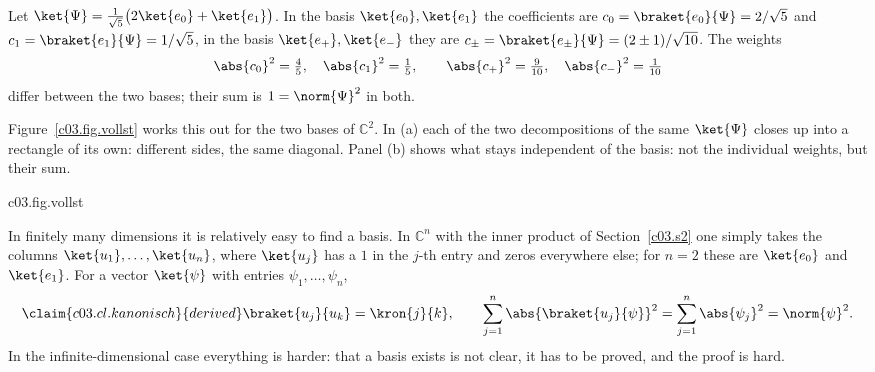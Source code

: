 \begin{example}\label{c03.ex.zwei-basen}
  Let $\ket{\Psi} = \tfrac{1}{\sqrt{5}} \bigl( 2 \ket{e_0} + \ket{e_1} \bigr)$. In the basis
  $\ket{e_0}, \ket{e_1}$ the coefficients are $c_0 = \braket{e_0}{\Psi} = 2/\sqrt{5}$ and
  $c_1 = \braket{e_1}{\Psi} = 1/\sqrt{5}$, in the basis $\ket{e_+}, \ket{e_-}$ they are
  $c_\pm = \braket{e_\pm}{\Psi} = (2 \pm 1)/\sqrt{10}$. The weights
  \begin{equation}\label{c03.eq.gewichte}
    \abs{c_0}^2 = \tfrac45 , \quad \abs{c_1}^2 = \tfrac15 ,
    \qquad
    \abs{c_+}^2 = \tfrac{9}{10} , \quad \abs{c_-}^2 = \tfrac{1}{10}
  \end{equation}
  differ between the two bases; their sum is $1 = \norm{\Psi}^2$ in both.
\end{example}

Figure~\ref{c03.fig.vollst} works this out for the two bases of $\mathbb{C}^2$. In (a) each of
the two decompositions of the same $\ket{\Psi}$ closes up into a rectangle of its own: different
sides, the same diagonal. Panel (b) shows what stays independent of the basis: not the
individual weights, but their sum.

\begin{tpcfigure}{c03.fig.vollst}
  \caption{The completeness relation for one vector in two bases. (a) The vector
    $\ket{\Psi} = (2\ket{e_0} + \ket{e_1})/\sqrt{5}$ of Example~\ref{c03.ex.zwei-basen} (thick
    arrow) as the sum of its components $c_j \ket{\phi_j}$ with $c_j = \braket{\phi_j}{\Psi}$,
    once in the basis $\ket{e_0}, \ket{e_1}$ (rectangle closed with dashes), once in the basis
    $\ket{e_+}, \ket{e_-}$ (rectangle closed with dots). Since all coefficients are real,
    everything lies in the real plane spanned by $\ket{e_0}$ and $\ket{e_1}$; the rays of
    $\ket{e_\pm}$ bisect the angles between the axes. The two rectangles have different sides
    and the same diagonal. (b) The weights $\abs{c_j}^2$ as bar segments: $\tfrac45$ and
    $\tfrac15$ against $\tfrac{9}{10}$ and $\tfrac{1}{10}$. The split depends on the basis, the
    sum $\norm{\Psi}^2 = 1$ (dashed line) does not.}
\end{tpcfigure}

In finitely many dimensions it is relatively easy to find a basis. In $\mathbb{C}^n$ with the
inner product of Section~\ref{c03.s2} one simply takes the columns $\ket{u_1}, \dots, \ket{u_n}$, where $\ket{u_j}$ has a $1$ in the $j$-th entry
and zeros everywhere else; for $n = 2$ these are $\ket{e_0}$ and $\ket{e_1}$. For a vector
$\ket{\psi}$ with entries $\psi_1, \dots, \psi_n$,
\begin{equation}\label{c03.eq.kanonisch}\claim{c03.cl.kanonisch}{derived}
  \braket{u_j}{u_k} = \kron{j}{k} ,
  \qquad
  \sum_{j=1}^{n} \abs{\braket{u_j}{\psi}}^2 = \sum_{j=1}^{n} \abs{\psi_j}^2 = \norm{\psi}^2 .
\end{equation}
In the infinite-dimensional case everything is harder: that a basis exists is not clear, it has
to be proved, and the proof is hard.

